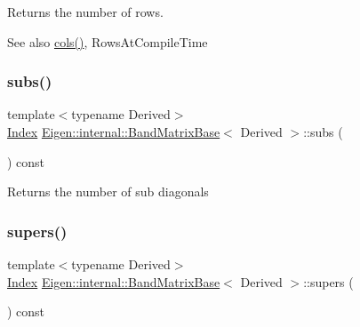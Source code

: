 \begin{DoxyReturn}{Returns}
the number of rows. 
\end{DoxyReturn}
\begin{DoxySeeAlso}{See also}
\mbox{\hyperlink{struct_eigen_1_1_eigen_base_a7b0b45c7351847696c911ce8aa2abbdb}{cols()}}, Rows\+At\+Compile\+Time 
\end{DoxySeeAlso}
\mbox{\label{class_eigen_1_1internal_1_1_band_matrix_base_a1115fe9b5a07d5218dacc15655a413cb}} 
\subsubsection{\texorpdfstring{subs()}{subs()}}
{\footnotesize\ttfamily template$<$typename Derived$>$ \\
\mbox{\hyperlink{struct_eigen_1_1_eigen_base_a554f30542cc2316add4b1ea0a492ff02}{Index}} \mbox{\hyperlink{class_eigen_1_1internal_1_1_band_matrix_base}{Eigen\+::internal\+::\+Band\+Matrix\+Base}}$<$ Derived $>$\+::subs (\begin{DoxyParamCaption}{ }\end{DoxyParamCaption}) const\hspace{0.3cm}{\ttfamily [inline]}}

\begin{DoxyReturn}{Returns}
the number of sub diagonals 
\end{DoxyReturn}
\mbox{\label{class_eigen_1_1internal_1_1_band_matrix_base_a58617da0d75d22b1f8dfdfde702ebb4a}} 
\subsubsection{\texorpdfstring{supers()}{supers()}}
{\footnotesize\ttfamily template$<$typename Derived$>$ \\
\mbox{\hyperlink{struct_eigen_1_1_eigen_base_a554f30542cc2316add4b1ea0a492ff02}{Index}} \mbox{\hyperlink{class_eigen_1_1internal_1_1_band_matrix_base}{Eigen\+::internal\+::\+Band\+Matrix\+Base}}$<$ Derived $>$\+::supers (\begin{DoxyParamCaption}{ }\end{DoxyParamCaption}) const\hspace{0.3cm}{\ttfamily [inline]}}

